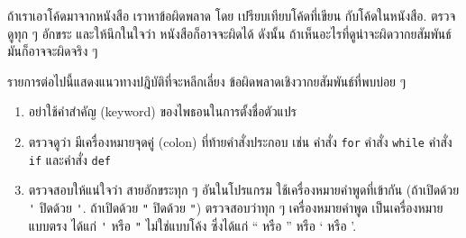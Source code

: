 
ถ้าเราเอาโค้ดมาจากหนังสือ
เราหาข้อผิดพลาด โดย เปรียบเทียบโค้ดที่เขียน กับโค้ดในหนังสือ.
ตรวจดูทุก ๆ อักขระ
และให้นึกในใจว่า หนังสือก็อาจจะผิดได้
ดังนั้น ถ้าเห็นอะไรที่ดูน่าจะผิดวากยสัมพันธ์ มันก็อาจจะผิดจริง ๆ


รายการต่อไปนี้แสดงแนวทางปฎิบัติที่จะหลีกเลี่ยง ข้อผิดพลาดเชิงวากยสัมพันธ์ที่พบบ่อย ๆ


\begin{enumerate}


\item อย่าใช้คำสำคัญ (keyword) ของไพธอนในการตั้งชื่อตัวแปร



\item ตรวจดูว่า มีเครื่องหมายจุดคู่ (colon) ที่ท้ายคำสั่งประกอบ เช่น คำสั่ง \texttt{for} คำสั่ง \texttt{while} คำสั่ง
\texttt{if} และคำสั่ง \texttt{def}



\item ตรวจสอบให้แน่ใจว่า สายอักขระทุก ๆ อันในโปรแกรม ใช้เครื่องหมายคำพูดที่เข้ากัน
(ถ้าเปิดด้วย \verb|'| ปิดด้วย \verb|'|.
ถ้าเปิดด้วย \verb|"| ปิดด้วย \verb|"|)
ตรวจสอบว่าทุก ๆ เครื่องหมายคำพูด เป็นเครื่องหมายแบบตรง ได้แก่ \verb|'| หรือ \verb|"| ไม่ใช่แบบโค้ง ซึ่งได้แก่ `` หรือ '' หรือ ` หรือ '.




\end{enumerate}
